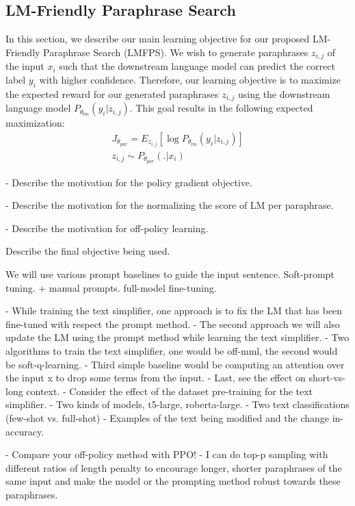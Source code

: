 \documentclass[11pt]{article}
\begin{document}
\subsection{LM-Friendly Paraphrase Search}
In this section, we describe our main learning objective for our proposed LM-Friendly Paraphrase Search (LMFPS). We wish to generate paraphrases $z_{i,j}$ of the input $x_i$ such that the downstream language model can predict the correct label $y_i$ with higher confidence. Therefore, our learning objective is to maximize the expected reward for our generated paraphrases $z_{i,j}$ using the downstream language model $P_{\theta_{lm}} (y_i | z_{i,j})$. This goal results in the following expected maximization:
\begin{multline}
J_{\theta_{par}} = E_{z_{i,j}} [\log P_{\theta_{lm}} (y_i | z_{i,j})] \\
z_{i,j} \sim P_{\theta_{par}}(.|x_i)
\label{lmfp}
\end{multline}


- Describe the motivation for the policy gradient objective.

- Describe the motivation for the normalizing the score of LM per paraphrase.

- Describe the motivation for off-policy learning.

Describe the final objective being used.

We will use various prompt baselines to guide the input sentence.
Soft-prompt tuning.
+ manual prompts.
full-model fine-tuning.

- While training the text simplifier, one approach is to fix the LM that has been fine-tuned with respect the prompt method.
- The second approach we will also update the LM using the prompt method while learning the text simplifier.
- Two algorithms to train the text simplifier, one would be off-mml, the second would be soft-q-learning.
- Third simple baseline would be computing an attention over the input x to drop some terms from the input.
- Last, see the effect on short-vs-long context.
- Consider the effect of the dataset pre-training for the text simplifier.
- Two kinds of models, t5-large, roberta-large.
- Two text classifications (few-shot vs. full-shot)
- Examples of the text being modified and the change in-accuracy.

- Compare your off-policy method with PPO!
- I can do top-p sampling with different ratios of length penalty to encourage longer, shorter paraphrases of the same input and make the model or the prompting method robust towards these paraphrases.
\end{document}
